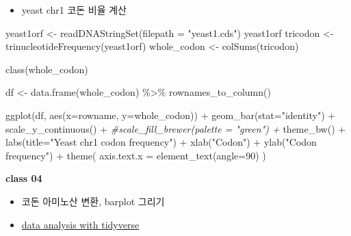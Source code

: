 \documentclass[
]{book}
\newenvironment{Shaded}{\begin{snugshade}}{\end{snugshade}}
\newcommand{\AttributeTok}[1]{\textcolor[rgb]{0.77,0.63,0.00}{#1}}
\newcommand{\CommentTok}[1]{\textcolor[rgb]{0.56,0.35,0.01}{\textit{#1}}}
\newcommand{\DecValTok}[1]{\textcolor[rgb]{0.00,0.00,0.81}{#1}}
\newcommand{\FunctionTok}[1]{\textcolor[rgb]{0.00,0.00,0.00}{#1}}
\newcommand{\NormalTok}[1]{#1}
\newcommand{\OtherTok}[1]{\textcolor[rgb]{0.56,0.35,0.01}{#1}}
\newcommand{\SpecialCharTok}[1]{\textcolor[rgb]{0.00,0.00,0.00}{#1}}
\newcommand{\StringTok}[1]{\textcolor[rgb]{0.31,0.60,0.02}{#1}}
\providecommand{\tightlist}{%
  \setlength{\itemsep}{0pt}\setlength{\parskip}{0pt}}
\begin{document}
\begin{itemize}
\tightlist
\item
  yeast chr1 코돈 비율 계산
\end{itemize}

\begin{Shaded}
\begin{Highlighting}[]
\NormalTok{yeast1orf }\OtherTok{\textless{}{-}} \FunctionTok{readDNAStringSet}\NormalTok{(}\AttributeTok{filepath =} \StringTok{"yeast1.cds"}\NormalTok{)}
\NormalTok{yeast1orf}
\NormalTok{tricodon }\OtherTok{\textless{}{-}} \FunctionTok{trinucleotideFrequency}\NormalTok{(yeast1orf)}
\NormalTok{whole\_codon }\OtherTok{\textless{}{-}} \FunctionTok{colSums}\NormalTok{(tricodon)}

\FunctionTok{class}\NormalTok{(whole\_codon)}

\NormalTok{df }\OtherTok{\textless{}{-}} \FunctionTok{data.frame}\NormalTok{(whole\_codon) }\SpecialCharTok{\%\textgreater{}\%} 
  \FunctionTok{rownames\_to\_column}\NormalTok{() }

\FunctionTok{ggplot}\NormalTok{(df, }\FunctionTok{aes}\NormalTok{(}\AttributeTok{x=}\NormalTok{rowname, }\AttributeTok{y=}\NormalTok{whole\_codon)) }\SpecialCharTok{+}
  \FunctionTok{geom\_bar}\NormalTok{(}\AttributeTok{stat=}\StringTok{"identity"}\NormalTok{) }\SpecialCharTok{+}
  \FunctionTok{scale\_y\_continuous}\NormalTok{() }\SpecialCharTok{+}
  \CommentTok{\#scale\_fill\_brewer(palette = "green") +}
  \FunctionTok{theme\_bw}\NormalTok{() }\SpecialCharTok{+}
  \FunctionTok{labs}\NormalTok{(}\AttributeTok{title=}\StringTok{"Yeast chr1 codon frequency"}\NormalTok{) }\SpecialCharTok{+}
  \FunctionTok{xlab}\NormalTok{(}\StringTok{"Codon"}\NormalTok{) }\SpecialCharTok{+} 
  \FunctionTok{ylab}\NormalTok{(}\StringTok{"Codon frequency"}\NormalTok{) }\SpecialCharTok{+}
  \FunctionTok{theme}\NormalTok{(}
    \AttributeTok{axis.text.x =} \FunctionTok{element\_text}\NormalTok{(}\AttributeTok{angle=}\DecValTok{90}\NormalTok{)}
\NormalTok{  )}
\end{Highlighting}
\end{Shaded}

\textbf{class 04}

\begin{itemize}
\tightlist
\item
  코돈 아미노산 변환, barplot 그리기
\item
  \href{https://greendaygh.github.io/kribbr2022/tidyverse.html\#dplyr}{data analysis with tidyverse}
\end{itemize}
\end{document}
